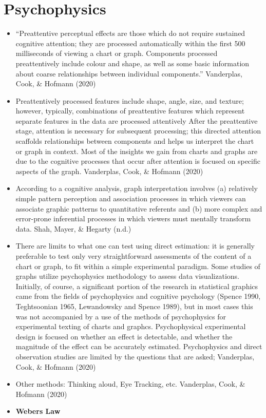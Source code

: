 \documentclass[print]{nuthesis}
\begin{document}
\hypertarget{psychophysics}{%
\section{Psychophysics}\label{psychophysics}}

\begin{itemize}
\item
  ``Preattentive perceptual effects are those which do not require sustained cognitive attention; they are processed automatically within the first 500 milliseconds of viewing a chart or graph. Components processed preattentively include colour and shape, as well as some basic information about coarse relationships between individual components.'' Vanderplas, Cook, \& Hofmann (2020)
\item
  Preattentively processed features include shape, angle, size, and texture; however, typically, combinations of preattentive features which represent separate features in the data are processed attentively
  After the preattentive stage, attention is necessary for subsequent processing; this directed attention scaffolds relationships between components and helps us interpret the chart or graph in context. Most of the insights we gain from charts and graphs are due to the cognitive processes that occur after attention is focused on specific aspects of the graph. Vanderplas, Cook, \& Hofmann (2020)
\item
  According to a cognitive analysis, graph interpretation involves (a) relatively simple pattern perception and association processes in which viewers can associate graphic patterns to quantitative referents and (b) more complex and error-prone inferential processes in which viewers must mentally transform data. Shah, Mayer, \& Hegarty (n.d.)
\item
  There are limits to what one can test using direct estimation: it is generally preferable to test only very straightforward assessments of the content of a chart or graph, to fit within a simple experimental paradigm. Some studies of graphs utilize psychophysics methodology to assess data visualizations. Initially, of course, a significant portion of the research in statistical graphics came from the fields of psychophysics and cognitive psychology (Spence 1990, Teghtsoonian 1965, Lewandowsky and Spence 1989), but in most cases this was not accompanied by a use of the methods of psychophysics for experimental texting of charts and graphcs. Psychophysical experimental design is focused on whether an effect is detectable, and whether the magnitude of the effect can be accurately estimated. Psychophysics and direct
  observation studies are limited by the questions that are asked; Vanderplas, Cook, \& Hofmann (2020)
\item
  Other methods: Thinking aloud, Eye Tracking, etc. Vanderplas, Cook, \& Hofmann (2020)
\item
  \textbf{Webers Law}


\end{itemize}
\end{document}
